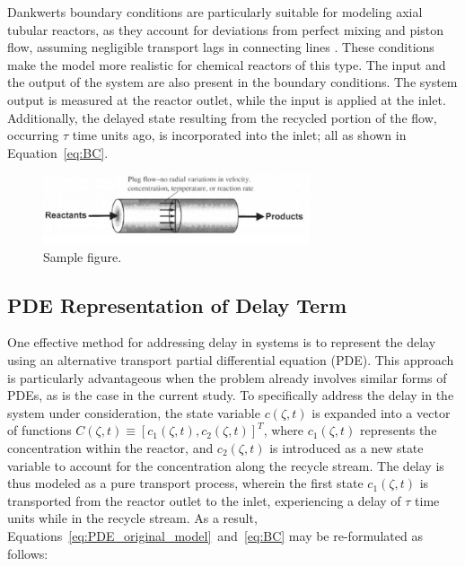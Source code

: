 Dankwerts boundary conditions are particularly suitable for modeling axial tubular reactors, as they account for deviations from perfect mixing and piston flow, assuming negligible transport lags in connecting lines \autocite{danckwerts1993continuous}. These conditions make the model more realistic for chemical reactors of this type. The input and the output of the system are also present in the boundary conditions. The system output is measured at the reactor outlet, while the input is applied at the inlet. Additionally, the delayed state resulting from the recycled portion of the flow, occurring $\tau$ time units ago, is incorporated into the inlet; all as shown in Equation~\ref{eq:BC}.


\begin{figure}[ht]
    \centering
    \includegraphics[width=0.7\textwidth]{Figures/sample.jpeg}
    \caption{Sample figure.}
    \label{fig:reactor_scheme}
\end{figure}

\subsection{PDE Representation of Delay Term}

One effective method for addressing delay in systems is to represent the delay using an alternative transport partial differential equation (PDE). This approach is particularly advantageous when the problem already involves similar forms of PDEs, as is the case in the current study. To specifically address the delay in the system under consideration, the state variable $c(\zeta, t)$ is expanded into a vector of functions $C(\zeta, t) \equiv [c_1(\zeta, t), c_2(\zeta, t)]^T$, where $c_1(\zeta, t)$ represents the concentration within the reactor, and $c_2(\zeta, t)$ is introduced as a new state variable to account for the concentration along the recycle stream. The delay is thus modeled as a pure transport process, wherein the first state $c_1(\zeta, t)$ is transported from the reactor outlet to the inlet, experiencing a delay of $\tau$ time units while in the recycle stream. As a result, Equations~\ref{eq:PDE_original_model}~and~\ref{eq:BC} may be re-formulated as follows:

